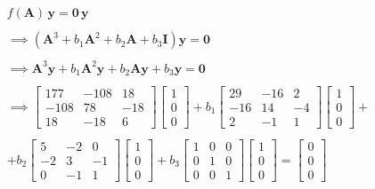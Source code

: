 \documentclass[openany]{book}
\begin{document}
\begin{gather*}
f(\textbf{A})  \, \textbf{y} = \textbf{0} \, \textbf{y}  \\ \\
\implies (\textbf{A}^3 + b_1 \textbf{A}^2 + b_{2} \textbf{A} + b_3 \textbf{I})  \textbf{y} = \textbf{0} \\ \\
\implies \textbf{A}^3 \textbf{y} + b_1 \textbf{A}^{2} \textbf{y} + b_{2} \textbf{A} \textbf{y} + b_3 \textbf{y} = \textbf{0} \\ \\
\implies
\begin{bmatrix} 
    177 & -108 & 18 \\ 
    -108 & 78 & -18 \\
    18 & -18 & 6    
\end{bmatrix}
\begin{bmatrix} 1 \\ 0 \\ 0 \end{bmatrix}
+ b_1
\begin{bmatrix} 
    29 & -16 & 2 \\ 
    -16 & 14 & -4 \\
    2 & -1 & 1    
\end{bmatrix}
\begin{bmatrix} 1 \\ 0 \\ 0 \end{bmatrix} + \\ \\
+ b_2
\begin{bmatrix} 
    5 & -2 & 0 \\ 
    -2 & 3 & -1 \\
    0 & -1 & 1    
\end{bmatrix} 
\begin{bmatrix} 1 \\ 0 \\ 0 \end{bmatrix} + 
b_3
\begin{bmatrix} 
    1 & 0 & 0 \\ 
    0 & 1 & 0 \\
    0 & 0 & 1    
\end{bmatrix}
\begin{bmatrix} 1 \\ 0 \\ 0 \end{bmatrix} =
\begin{bmatrix} 0 \\ 0 \\ 0 \end{bmatrix} \\ \\

\end{gather*}
\end{document}
